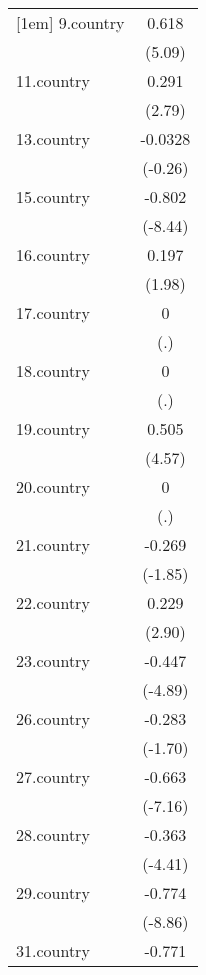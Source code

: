 {\begin{tabular}{l*{1}{c}}
[1em]
9.country   &       0.618\sym{***}\\
            &      (5.09)         \\
[1em]
11.country  &       0.291\sym{**} \\
            &      (2.79)         \\
[1em]
13.country  &     -0.0328         \\
            &     (-0.26)         \\
[1em]
15.country  &      -0.802\sym{***}\\
            &     (-8.44)         \\
[1em]
16.country  &       0.197\sym{*}  \\
            &      (1.98)         \\
[1em]
17.country  &           0         \\
            &         (.)         \\
[1em]
18.country  &           0         \\
            &         (.)         \\
[1em]
19.country  &       0.505\sym{***}\\
            &      (4.57)         \\
[1em]
20.country  &           0         \\
            &         (.)         \\
[1em]
21.country  &      -0.269         \\
            &     (-1.85)         \\
[1em]
22.country  &       0.229\sym{**} \\
            &      (2.90)         \\
[1em]
23.country  &      -0.447\sym{***}\\
            &     (-4.89)         \\
[1em]
26.country  &      -0.283         \\
            &     (-1.70)         \\
[1em]
27.country  &      -0.663\sym{***}\\
            &     (-7.16)         \\
[1em]
28.country  &      -0.363\sym{***}\\
            &     (-4.41)         \\
[1em]
29.country  &      -0.774\sym{***}\\
            &     (-8.86)         \\
[1em]
31.country  &      -0.771\sym{***}\\

\end{tabular}}
